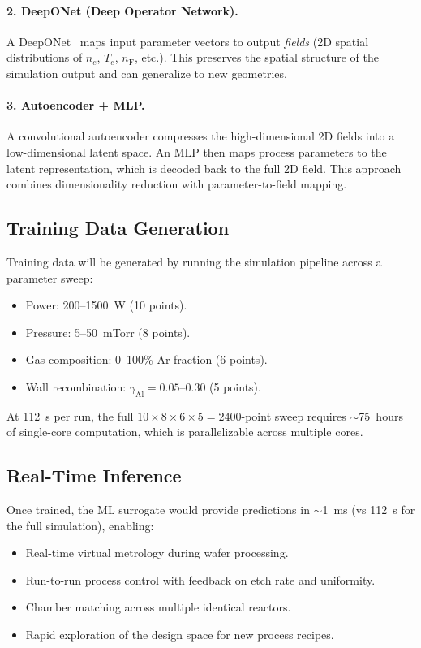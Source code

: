 \documentclass[11pt,a4paper]{report}
\newcommand{\Te}{T_e}
\begin{document}
\paragraph{2. DeepONet (Deep Operator Network).}  A DeepONet~\cite{Lu2021} maps input parameter vectors to output \emph{fields} (2D spatial distributions of $n_e$, $\Te$, $n_\mathrm{F}$, etc.).  This preserves the spatial structure of the simulation output and can generalize to new geometries.

\paragraph{3. Autoencoder + MLP.}  A convolutional autoencoder compresses the high-dimensional 2D fields into a low-dimensional latent space.  An MLP then maps process parameters to the latent representation, which is decoded back to the full 2D field.  This approach combines dimensionality reduction with parameter-to-field mapping.

\subsection{Training Data Generation}

Training data will be generated by running the simulation pipeline across a parameter sweep:
\begin{itemize}
  \item Power: 200--1500~W (10 points).
  \item Pressure: 5--50~mTorr (8 points).
  \item Gas composition: 0--100\% Ar fraction (6 points).
  \item Wall recombination: $\gamma_\mathrm{Al} = 0.05$--0.30 (5 points).
\end{itemize}
At \SI{112}{\second} per run, the full $10 \times 8 \times 6 \times 5 = 2400$-point sweep requires $\sim$75~hours of single-core computation, which is parallelizable across multiple cores.

\subsection{Real-Time Inference}

Once trained, the ML surrogate would provide predictions in $\sim$\SI{1}{\milli\second} (vs \SI{112}{\second} for the full simulation), enabling:
\begin{itemize}
  \item Real-time virtual metrology during wafer processing.
  \item Run-to-run process control with feedback on etch rate and uniformity.
  \item Chamber matching across multiple identical reactors.
  \item Rapid exploration of the design space for new process recipes.
\end{itemize}
\end{document}
